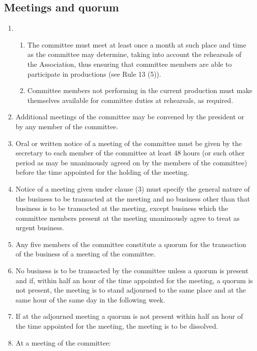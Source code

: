\documentclass{article}
\begin{document}
\subsection{Meetings and quorum}
\label{meetings-and-quorum}
\begin{enumerate}
  \item \begin{enumerate}
    \item The committee must meet at least once a month at such place and time as the committee may determine, taking into account the rehearsals of the Association, thus ensuring that committee members are able to participate in productions (see Rule 13 (5)).
    \item Committee members not performing in the current production must make themselves available for committee duties at rehearsals, as required.
  \end{enumerate}
\item Additional meetings of the committee may be convened by the president or by any member of the committee.
\item Oral or written notice of a meeting of the committee must be given by the secretary to each member of the committee at least 48 hours (or such other period as may be unanimously agreed on by the members of the committee) before the time appointed for the holding of the meeting.
\item Notice of a meeting given under clause (3) must specify the general nature of the business to be transacted at the meeting and no business other than that business is to be transacted at the meeting, except business which the committee members present at the meeting unanimously agree to treat as urgent business.
\item \label{five-members}Any five members of the committee constitute a quorum for the transaction of the business of a meeting of the committee.
\item No business is to be transacted by the committee unless a quorum is present and if, within half an hour of the time appointed for the meeting, a quorum is not present, the meeting is to stand adjourned to the same place and at the same hour of the same day in the following week.
\item If at the adjourned meeting a quorum is not present within half an hour of the time appointed for the meeting, the meeting is to be dissolved.
\item At a meeting of the committee:
  \begin{enumerate}

\end{enumerate}
\end{enumerate}
\end{document}
